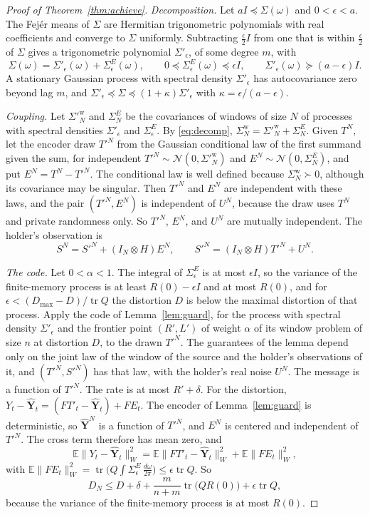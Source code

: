 \documentclass[11pt,onecolumn]{IEEEtran}
\newcommand{\E}{\mathbb{E}}
\newcommand{\tr}{\operatorname{tr}}
\newcommand{\hY}{\hat{\mathbf Y}}
\newcommand{\dw}{\tfrac{d\omega}{2\pi}}
\begin{document}
\begin{proof}[Proof of Theorem~\ref{thm:achieve}]
\emph{Decomposition.} Let $aI\preceq\Sigma(\omega)$ and
$0<\epsilon<a$. The Fej\'er means of $\Sigma$ are Hermitian
trigonometric polynomials with real coefficients and converge to
$\Sigma$ uniformly. Subtracting $\tfrac\epsilon2I$ from one that is
within $\tfrac\epsilon2$ of $\Sigma$ gives a trigonometric polynomial
$\Sigma'_\epsilon$, of some degree $m$, with
\begin{equation}
\Sigma(\omega)=\Sigma'_\epsilon(\omega)+\Sigma^E_\epsilon(\omega),
\qquad
0\preceq\Sigma^E_\epsilon(\omega)\preceq\epsilon I,
\qquad
\Sigma'_\epsilon(\omega)\succeq(a-\epsilon)I .
\label{eq:decomp}
\end{equation}
A stationary Gaussian process with spectral density $\Sigma'_\epsilon$
has autocovariance zero beyond lag $m$, and
$\Sigma'_\epsilon\preceq\Sigma\preceq(1+\kappa)\Sigma'_\epsilon$ with
$\kappa=\epsilon/(a-\epsilon)$.

\emph{Coupling.} Let $\Sigma'^{\mathrm w}_N$ and $\Sigma^{E}_N$ be the
covariances of windows of size $N$ of processes with spectral densities
$\Sigma'_\epsilon$ and $\Sigma^E_\epsilon$. By \eqref{eq:decomp},
$\Sigma^{\mathrm w}_N=\Sigma'^{\mathrm w}_N+\Sigma^E_N$. Given $T^N$, let
the encoder draw $T'^N$ from the Gaussian conditional law of the first
summand given the sum, for independent
$T'^N\sim\mathcal N(0,\Sigma'^{\mathrm w}_N)$ and
$E^N\sim\mathcal N(0,\Sigma^E_N)$, and put $E^N=T^N-T'^N$. The
conditional law is well defined because $\Sigma^{\mathrm w}_N\succ0$,
although its covariance may be singular. Then $T'^N$ and
$E^N$ are independent with these laws, and the pair $(T'^N,E^N)$ is
independent of $U^N$, because the draw uses $T^N$ and private randomness
only. So $T'^N$, $E^N$, and $U^N$ are mutually independent. The
holder's observation is
\[
S^N=S'^N+(I_N\otimes H)E^N,\qquad S'^N=(I_N\otimes H)T'^N+U^N .
\]

\emph{The code.} Let $0<\alpha<1$. The integral of
$\Sigma^E_\epsilon$ is at most $\epsilon I$, so the variance of the
finite-memory process is at least $R(0)-\epsilon I$ and at most $R(0)$,
and for $\epsilon<(D_{\max}-D)/\tr Q$ the distortion $D$ is below the
maximal distortion of that process. Apply the code of
Lemma~\ref{lem:guard}, for the process with spectral density
$\Sigma'_\epsilon$ and the frontier point $(R',L')$ of weight $\alpha$ of
its window problem of size $n$ at distortion $D$, to the drawn $T'^N$.
The guarantees of the lemma depend only on the joint law of the window
of the source and the holder's observations of it, and
$(T'^N,S'^N)$ has that law, with the holder's real noise $U^N$. The
message is a function of $T'^N$. The rate is at
most $R'+\delta$. For the distortion,
$Y_t-\hY_t=(FT'_t-\hY_t)+FE_t$. The encoder of Lemma~\ref{lem:guard} is
deterministic, so $\hY^N$ is a function of $T'^N$, and $E^N$ is centered
and independent of $T'^N$. The cross term therefore has mean zero, and
\[
\E\|Y_t-\hY_t\|_W^2=\E\|FT'_t-\hY_t\|_W^2+\E\|FE_t\|_W^2 ,
\]
with $\E\|FE_t\|_W^2=\tr\bigl(Q\int\Sigma^E_\epsilon\,\dw\bigr)\le\epsilon\tr Q$. So
\[
D_N\le D+\delta+\frac{m}{n+m}\tr\bigl(QR(0)\bigr)+\epsilon\tr Q,
\]
because the variance of the finite-memory process is at most $R(0)$.


\end{proof}
\end{document}
